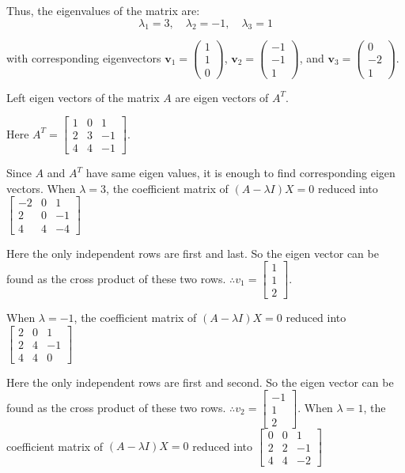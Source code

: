 \documentclass[
  letterpaper,
  DIV=11,
  numbers=noendperiod]{scrreprt}
\theoremstyle{plain}
\theoremstyle{definition}
\theoremstyle{remark}
\begin{document}
Thus, the eigenvalues of the matrix are: \[
\lambda_1 = 3, \quad \lambda_2 = -1, \quad \lambda_3 = 1
\]

with corresponding eigenvectors
\(\mathbf{v}_1=\begin{pmatrix} 1 \\ 1 \\ 0 \end{pmatrix}\),
\(\mathbf{v}_2=\begin{pmatrix} -1 \\ -1 \\ 1 \end{pmatrix}\), and
\(\mathbf{v}_3=\begin{pmatrix} 0 \\ -2 \\ 1 \end{pmatrix}\).

Left eigen vectors of the matrix \(A\) are eigen vectors of \(A^T\).

Here \(A^T=\begin{bmatrix}
    1&0&1\\ 2&3&-1\\ 4&4&-1
\end{bmatrix}\).

Since \(A\) and \(A^T\) have same eigen values, it is enough to find
corresponding eigen vectors. When \(\lambda=3\), the coefficient matrix
of \((A-\lambda I)X=0\) reduced into \(\begin{bmatrix}
    -2&0&1\\ 2&0&-1\\ 4&4&-4
\end{bmatrix}\)

Here the only independent rows are first and last. So the eigen vector
can be found as the cross product of these two rows.
\(\therefore v_1=\begin{bmatrix}
    1\\1\\2
\end{bmatrix}\).

When \(\lambda=-1\), the coefficient matrix of \((A-\lambda I)X=0\)
reduced into \(\begin{bmatrix}
    2&0&1\\ 2&4&-1\\ 4&4&0
\end{bmatrix}\)

Here the only independent rows are first and second. So the eigen vector
can be found as the cross product of these two rows.
\(\therefore v_2=\begin{bmatrix}
    -1\\1\\2
\end{bmatrix}\). When \(\lambda=1\), the coefficient matrix of
\((A-\lambda I)X=0\) reduced into \(\begin{bmatrix}
    0&0&1\\ 2&2&-1\\ 4&4&-2
\end{bmatrix}\)
\end{document}
